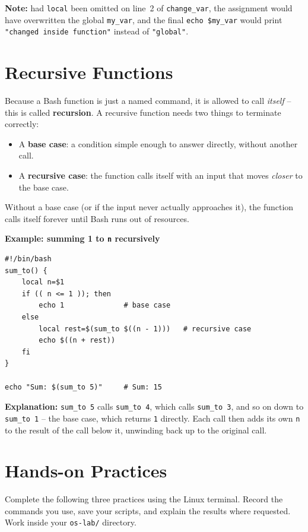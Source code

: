 \textbf{Note:} had \texttt{local} been omitted on line~2 of \texttt{change\_var}, the assignment would have overwritten the global \texttt{my\_var}, and the final \texttt{echo \$my\_var} would print \texttt{"changed inside function"} instead of \texttt{"global"}.

\section{Recursive Functions}
Because a Bash function is just a named command, it is allowed to call \emph{itself} -- this is called \textbf{recursion}. A recursive function needs two things to terminate correctly:
\begin{itemize}
    \item A \textbf{base case}: a condition simple enough to answer directly, without another call.
    \item A \textbf{recursive case}: the function calls itself with an input that moves \emph{closer} to the base case.
\end{itemize}
Without a base case (or if the input never actually approaches it), the function calls itself forever until Bash runs out of resources.

\textbf{Example: summing 1 to \texttt{n} recursively}
\begin{lstlisting}[language=Terminal]
#!/bin/bash
sum_to() {
    local n=$1
    if (( n <= 1 )); then
        echo 1              # base case
    else
        local rest=$(sum_to $((n - 1)))   # recursive case
        echo $((n + rest))
    fi
}

echo "Sum: $(sum_to 5)"     # Sum: 15
\end{lstlisting}
\textbf{Explanation:} \texttt{sum\_to 5} calls \texttt{sum\_to 4}, which calls \texttt{sum\_to 3}, and so on down to \texttt{sum\_to 1} -- the base case, which returns \texttt{1} directly. Each call then adds its own \texttt{n} to the result of the call below it, unwinding back up to the original call.


\section{Hands-on Practices}
Complete the following three practices using the Linux terminal. Record the commands you use, save your scripts, and explain the results where requested. Work inside your \texttt{os-lab/} directory.

